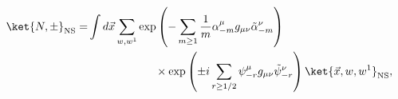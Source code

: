 \begin{equation}
\begin{split}
 \ket{N,\pm}_{\rm NS} =& \int d \vec x \sum_{w,w^1}
 \exp \left( - \sum_{m \geq 1} 
   \frac{1}{m} \alpha^{\mu}_{-m} g_{\mu \nu} \tilde \alpha^{\nu}_{-m} \right) 
 \\ & \qquad \qquad \qquad \times \exp \left( \pm i  \sum_{r \geq 1/2} 
    \psi^{\mu}_{-r} g_{\mu \nu} \tilde \psi^{\nu}_{-r} \right) 
  \ket{\vec x, w,w^1}_{\rm NS} ,
\label{Npm}
\end{split}
\end{equation}

